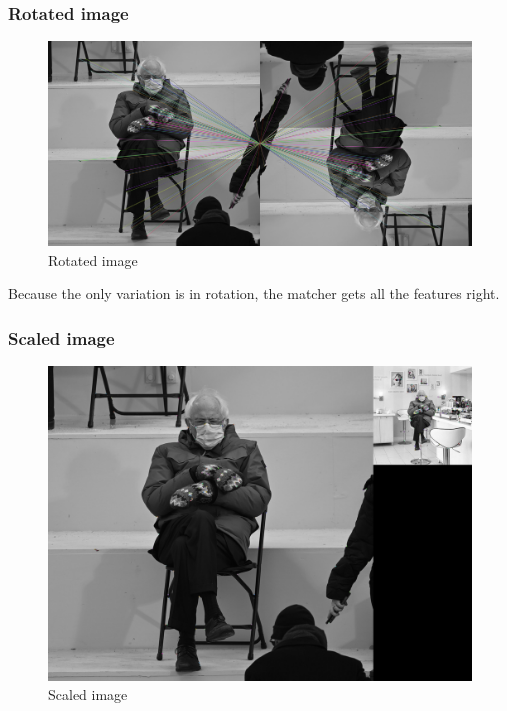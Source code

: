 \documentclass[12pt,a4paper]{report}
\begin{document}
\clearpage
\subsubsection*{Rotated image}

\begin{figure}[ht]
	\centering
	\includegraphics[width=\textwidth]{bernie180.jpg_match}
	\caption{Rotated image}
\end{figure}

Because the only variation is in rotation, the matcher gets all the features right.

\clearpage
\subsubsection*{Scaled image}

\begin{figure}[ht]
	\centering
	\includegraphics[width=\textwidth]{bernieBenefitBeautySalon.jpeg_match}
	\caption{Scaled image}
\end{figure}
\end{document}
